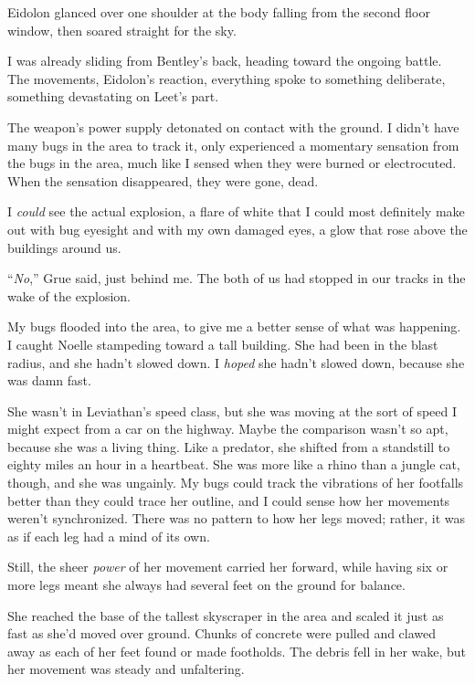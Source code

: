 Eidolon glanced over one shoulder at the body falling from the second floor window, then soared straight for the sky.



I was already sliding from Bentley's back, heading toward the ongoing battle.  The movements, Eidolon's reaction, everything spoke to something deliberate, something devastating on Leet's part.



The weapon's power supply detonated on contact with the ground.  I didn't have many bugs in the area to track it, only experienced a momentary sensation from the bugs in the area, much like I sensed when they were burned or electrocuted.  When the sensation disappeared, they were gone, dead.



I \emph{could} see the actual explosion, a flare of white that I could most definitely make out with bug eyesight and with my own damaged eyes, a glow that rose above the buildings around us.



``\emph{No},'' Grue said, just behind me.  The both of us had stopped in our tracks in the wake of the explosion.



My bugs flooded into the area, to give me a better sense of what was happening.  I caught Noelle stampeding toward a tall building. She had been in the blast radius, and she hadn't slowed down.  I \emph{hoped} she hadn't slowed down, because she was damn fast.



She wasn't in Leviathan's speed class, but she was moving at the sort of speed I might expect from a car on the highway.  Maybe the comparison wasn't so apt, because she was a living thing.  Like a predator, she shifted from a standstill to eighty miles an hour in a heartbeat.  She was more like a rhino than a jungle cat, though, and she was ungainly.  My bugs could track the vibrations of her footfalls better than they could trace her outline, and I could sense how her movements weren't synchronized.  There was no pattern to how her legs moved; rather, it was as if each leg had a mind of its own.



Still, the sheer \emph{power} of her movement carried her forward, while having six or more legs meant she always had several feet on the ground for balance.



She reached the base of the tallest skyscraper in the area and scaled it just as fast as she'd moved over ground.  Chunks of concrete were pulled and clawed away as each of her feet found or made footholds.  The debris fell in her wake, but her movement was steady and unfaltering.



